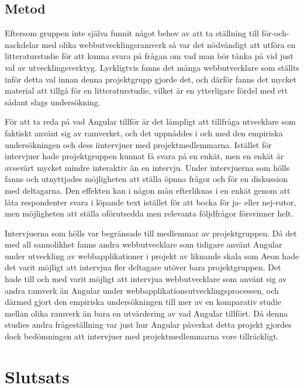      


\subsection{Metod}

Eftersom gruppen inte själva funnit något behov av att ta ställning till för-och-nackdelar med olika webbutvecklingsramverk så var det nödvändigt att utföra en litteraturstudie för att kunna svara på frågan om vad man bör tänka på vid just val av utvecklingsverktyg. Lyckligtvis fanns det många webbutvecklare som ställts inför detta val innan denna projektgrupp gjorde det, och därför fanns det mycket material att tillgå för en litteraturstudie, vilket är en ytterligare fördel med ett sådant slags undersökning.

För att ta reda på vad Angular tillför är det lämpligt att tillfråga utvecklare som faktiskt använt sig av ramverket, och det uppnåddes i och med den empiriska undersökningen och dess iintervjuer med projektmedlemmarna. Istället för intervjuer hade projektgruppen kunnat få svara på en enkät, men en enkät är avsevärt mycket mindre interaktiv än en intervju. Under intervjuerna som hölls fanns och utnyttjades möjligheten att ställa öpnna frågor och för en diskussion med deltagarna. Den effekten kan i någon mån efterliknas i en enkät genom att låta respondenter svara i löpande text istället för att bocka för ja- eller nej-rutor, men möjligheten att ställa oförutsedda men relevanta följdfrågor försvinner helt. 

Intervjuerna som hölls var begränsade till medlemmar av projektgruppen. Då det med all sannolikhet fanns andra webbutvecklare som tidigare använt Angular under utveckling av webbapplikationer i projekt av liknande skala som Aeon hade det varit möjligt att intervjua fler deltagare utöver bara projektgruppen. Det hade till och med varit möjligt att intervjua webbutvecklare som använt sig av andra ramverk än Angular under webbapplikationsutvecklingsprocessen, och därmed gjort den empiriska undersökningen till mer av en komparativ studie mellan olika ramverk än bara en utvärdering av vad Angular tillfört. Då denna studies andra frågeställning var just hur Angular påverkat detta projekt gjordes dock bedömningen att intervjuer med projektmedlemmarna vore tillräckligt.

\section{Slutsats}

